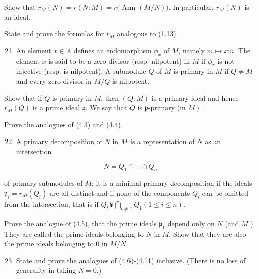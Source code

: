 \documentclass{standalone}
\theoremstyle{definition}
\theoremstyle{remark}
\begin{document}
Show that $r_{M}(N)=r(N: M)=r($ Ann $(M / N))$. In particular, $r_{M}(N)$ is an
ideal.

State and prove the formulas for $r_{M}$ analogous to (1.13).

\begin{enumerate}
  \setcounter{enumi}{20}
  \item An element $x \in A$ defines an endomorphism $\phi_{x}$ of $M$, namely
  $m \mapsto x m$. The element $x$ is said to be a zero-divisor (resp.
  nilpotent) in $M$ if $\phi_{x}$ is not injective (resp. is nilpotent). A
  submodule $Q$ of $M$ is primary in $M$ if $Q \neq M$ and every zero-divisor in
  $M / Q$ is nilpotent.
\end{enumerate}

Show that if $Q$ is primary in $M$, then $(Q: M)$ is a primary ideal and hence
$r_{M}(Q)$ is a prime ideal $\mathfrak{p}$. We say that $Q$ is
$\mathfrak{p}$-primary (in $\left.M\right)$.

Prove the analogues of (4.3) and (4.4).

\begin{enumerate}
  \setcounter{enumi}{21}
  \item A primary decomposition of $N$ in $M$ is a representation of $N$ as an
  intersection
\end{enumerate}

\[
N=Q_{1} \cap \cdots \cap Q_{n}
\]

of primary submodules of $M$; it is a minimal primary decomposition if the
ideals $\mathfrak{p}_{i}=r_{M}\left(Q_{i}\right)$ are all distinct and if none
of the components $Q_{i}$ can be omitted from the intersection, that is if
$Q_{t} ¥ \bigcap_{t \neq 1} Q_{1}(1 \leqslant i \leqslant n)$.

Prove the analogue of (4.5), that the prime ideals $\mathfrak{p}_{1}$ depend
only on $N$ (and $M$ ). They are called the prime ideals belonging to $N$ in
$M$. Show that they are also the prime ideals belonging to 0 in $M / N$.

\begin{enumerate}
  \setcounter{enumi}{22}
  \item State and prove the analogues of (4.6)-(4.11) inclusive. (There is no
  loss of generality in taking $N=0$.)
\end{enumerate}
\end{document}
